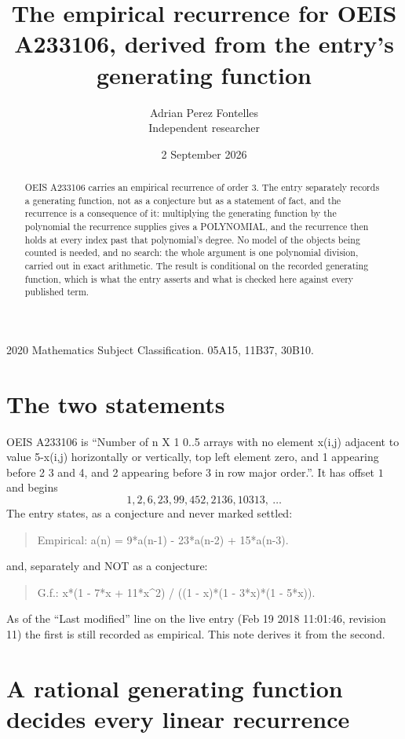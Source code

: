 \documentclass[11pt,a4paper]{article}
\title{The empirical recurrence for OEIS A233106, derived from the entry's generating function}
\author{Adrian Perez Fontelles\\ \small Independent researcher}
\date{2 September 2026}
\theoremstyle{plain}
\theoremstyle{definition}
\begin{document}
\maketitle

\begin{abstract}
OEIS A233106 carries an empirical recurrence of order $3$. The entry separately records a
generating function, not as a conjecture but as a statement of fact, and the recurrence is a
consequence of it: multiplying the generating function by the polynomial the recurrence
supplies gives a POLYNOMIAL, and the recurrence then holds at every index past that
polynomial's degree. No model of the objects being counted is needed, and no search: the
whole argument is one polynomial division, carried out in exact arithmetic. The result is
conditional on the recorded generating function, which is what the entry asserts and what is
checked here against every published term.
\end{abstract}

\noindent\small 2020 Mathematics Subject Classification. 05A15, 11B37, 30B10.\normalsize

\section{The two statements}

OEIS A233106 is ``Number of n X 1 0..5 arrays with no element x(i,j) adjacent to value 5-x(i,j) horizontally or vertically, top left element zero, and 1 appearing before 2 3 and 4, and 2 appearing before 3 in row major order.''. It has offset $1$ and begins
\[
1, 2, 6, 23, 99, 452, 2136, 10313,\ \dots
\]
The entry states, as a conjecture and never marked settled:
\begin{quote}
Empirical: a(n) = 9*a(n-1) - 23*a(n-2) + 15*a(n-3).
\end{quote}
and, separately and NOT as a conjecture:
\begin{quote}
G.f.: x*(1 - 7*x + 11*x\^{}2) / ((1 - x)*(1 - 3*x)*(1 - 5*x)).
\end{quote}
As of the ``Last modified'' line on the live entry (Feb 19 2018 11:01:46, revision 11) the first is still
recorded as empirical. This note derives it from the second.

\section{A rational generating function decides every linear recurrence}
\end{document}
